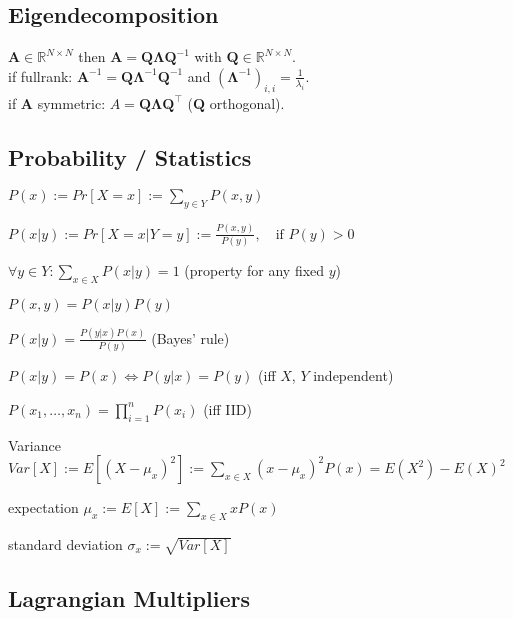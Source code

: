 \subsection*{Eigendecomposition}
$\mathbf{A} \in \mathbb{R}^{N \times N}$ then $\mathbf{A} = \mathbf{Q} \boldsymbol{\Lambda} \mathbf{Q}^{-1}$ with $\mathbf{Q} \in \mathbb{R}^{N \times N}$.\\
if fullrank: $\mathbf{A}^{-1} = \mathbf{Q} \boldsymbol{\Lambda}^{-1} \mathbf{Q}^{-1}$ and $(\boldsymbol{\Lambda}^{-1})_{i,i} = \frac{1}{\lambda_i}$.\\
if $\mathbf{A}$ symmetric: $A = \mathbf{Q} \boldsymbol{\Lambda} \mathbf{Q^\top}$ ($\mathbf{Q}$ orthogonal).

\subsection*{Probability / Statistics}
\begin{inparaitem}
	\item $P(x) := Pr[X = x] := \sum_{y \in Y} P(x, y)$
	\item $P(x|y) := Pr[X = x | Y = y] := \frac{P(x,y)}{P(y)},\quad \text{if } P(y) > 0$
	\item $\forall y \in Y: \sum_{x \in X} P(x|y) = 1$ (property for any fixed $y$)
	\item $P(x, y) = P(x|y) P(y)$
	\item $P(x|y) = \frac{P(y|x)P(x)}{P(y)}$ (Bayes' rule)
	\item $P(x|y) = P(x) \Leftrightarrow P(y|x) = P(y)$ (iff $X$, $Y$ independent)
	\item $P(x_1, \ldots, x_n) = \prod_{i=1}^n P(x_i)$ (iff IID)
	\item Variance $Var[X]:= E[(X-\mu_x)^2]:=\sum_{x \in X}(x-\mu_x)^2P(x)= E(X^2) - E(X)^2$
	\item expectation $\mu_x := E[X]:=\sum_{x \in X}xP(x)$
	\item standard deviation $\sigma_x := \sqrt{Var[X]}$
\end{inparaitem}


\subsection*{Lagrangian Multipliers}
\newline
\newline
